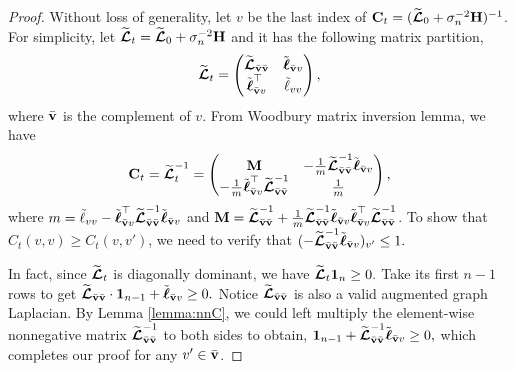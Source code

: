 \begin{proof}
	Without loss of generality, let $v$ be the last index of $\bC_t=(\widetilde{\cLap}_0 + \sigma_n^{-2}\bH)^{-1}$. For simplicity, let $\widetilde{\cLap}_t = \widetilde{\cLap}_0 + \sigma_n^{-2}\bH$ and it has the following matrix partition,
	\begin{equation*}
		\widetilde{\cLap}_t
		= \begin{pmatrix}
			\widetilde{\cLap}_{\bbv \bbv} & \tilde{\bell}_{\bbv v}
			\\
			\tilde{\bell}_{\bbv v}^\top & \tilde{\ell}_{vv}
		\end{pmatrix},
	\end{equation*}
	where $\bbv$ is the complement of $v$.
	From Woodbury matrix inversion lemma, we have
	\begin{equation}
		\bC_t = \widetilde{\cLap}_t^{-1}
		= \begin{pmatrix}
			\mathbf{M}
			 &
			-\frac{1}{m}
			\widetilde{\cLap}_{\bbv\bbv}^{-1} \tilde{\bell}_{\bbv v}
			\\
			-\frac{1}{m}
			\tilde{\bell}_{\bbv v}^\top \widetilde{\cLap}_{\bbv\bbv}^{-1}
			&
			\frac{1}{m}
		\end{pmatrix},	
	\end{equation}
	where $m=\tilde{\ell}_{vv} - \tilde{\bell}_{\bbv v}^\top \widetilde{\cLap}_{\bbv\bbv}^{-1} \tilde{\bell}_{\bbv v} $
	and $\mathbf{M}=
			 \widetilde{\cLap}_{\bbv\bbv}^{-1}+\frac{1}{m} 
			 \widetilde{\cLap}_{\bbv\bbv}^{-1} \tilde{\bell}_{\bbv v}
			 \tilde{\bell}_{\bbv v}^\top \widetilde{\cLap}_{\bbv\bbv}^{-1}
	$.
	To show that $C_t(v,v)\geq C_t(v,v')$, we need to verify that 
$
	(			-\widetilde{\cLap}_{\bbv\bbv}^{-1} \tilde{\bell}_{\bbv v}
)_{v'}\leq1.
$

	In fact, since $\widetilde{\cLap}_t
	$ is diagonally dominant, we have
	$\widetilde{\cLap}_t \bone_n\geq0.
	$
	Take its first $n-1$ rows to get
	$
		\widetilde{\cLap}_{\bbv \bbv}\cdot \bone_{n-1} +
		\tilde{\bell}_{\bbv v} \geq 0.
	$
	Notice $\widetilde{\cLap}_{\bbv \bbv}$ is also a valid augmented graph Laplacian. By Lemma \ref{lemma:nnC}, we could left multiply the element-wise nonnegative matrix $\widetilde{\cLap}_{\bbv \bbv}^{-1}$ to both sides to obtain,
$		\bone_{n-1} +
		\widetilde{\cLap}_{\bbv \bbv}^{-1}\tilde{\bell}_{\bbv v} \geq 0,
$
	which completes our proof for any $v'\in \bbv$.
\end{proof}

